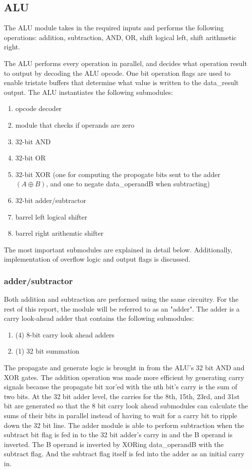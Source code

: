 \documentclass[letterpaper]{article}
\begin{document}
\subsection{ALU}
The ALU module takes in the required inputs and performs the following operations: addition, subtraction, AND, OR, shift logical left, shift arithmetic right.

The ALU performs every operation in parallel, and decides what operation result to output by decoding the ALU opcode. One bit operation flags are used to enable tristate buffers that determine what value is written to the data\_result output. The ALU instantiates the following submodules: 
\begin{enumerate}
    \item opcode decoder
    \item module that checks if operands are zero
    \item 32-bit AND
    \item 32-bit OR
    \item 32-bit XOR (one for computing the propogate bits sent to the adder $(A\oplus B)$, and one to negate data\_operandB when subtracting)
    \item 32-bit adder/subtractor
    \item barrel left logical shifter
    \item barrel right arithemtic shifter
\end{enumerate}
The most important submodules are explained in detail below. Additionally, implementation of overflow logic and output flags is discussed.

\subsubsection{adder/subtractor}
Both addition and subtraction are performed using the same circuitry. For the rest of this report, the module will be referred to as an "adder". The adder is a carry look-ahead adder that contains the following submodules: 
\begin{enumerate}
    \item (4) 8-bit carry look ahead adders
    \item (1) 32 bit summation
\end{enumerate}
The propagate and generate logic is brought in from the ALU's 32 bit AND and XOR gates. The addition operation was made more efficient by generating carry signals because the propagate bit xor'ed with the nth bit's carry is the sum of two bits. At the 32 bit adder level, the carries for the 8th, 15th, 23rd, and 31st bit are generated so that the 8 bit carry look ahead submodules can calculate the sums of their bits in parallel instead of having to wait for a carry bit to ripple down the 32 bit line. The adder module is able to perform subtraction when the subtract bit flag is fed in to the 32 bit adder's carry in and the B operand is inverted. The B operand is inverted by XORing data\_operandB with the subtract flag. And the subtract flag itself is fed into the adder as an initial carry in.
\end{document}
